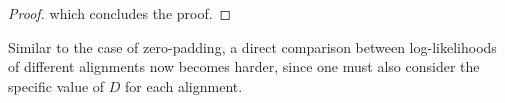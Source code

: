 \documentclass[12pt]{article}
\begin{document}
\begin{proof}
which concludes the proof.


\end{proof}

Similar to the case of zero-padding, a direct comparison between log-likelihoods of different alignments now becomes harder, since one must also consider the specific value of $D$ for each alignment.




\end{document}
